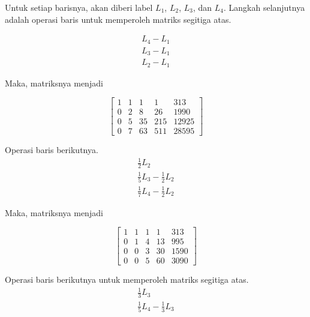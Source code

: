 Untuk setiap barisnya, akan diberi label \begin{math}L_1\end{math}, \begin{math}L_2\end{math}, \begin{math}L_3\end{math}, dan \begin{math}L_4\end{math}. Langkah selanjutnya adalah operasi baris untuk memperoleh matriks segitiga atas.

\begin{align*}
	L_4 - L_1 \\
	L_3 - L_1 \\
	L_2 - L_1
\end{align*}

Maka, matriksnya menjadi

\begin{center}
	\setlength\arraycolsep{15pt}
	\[
	\begin{bmatrix}
			1 	& 1 	& 1 	& 1 		& 313 		\\[1em]
			0 	& 2 	& 8 	& 26 		& 1990		\\[1em]
			0 	& 5 	& 35 	& 215 	& 12925		\\[1em]
			0 	& 7 	& 63 	& 511 	& 28595
	\end{bmatrix}
	\]
\end{center}

Operasi baris berikutnya.
\begin{align*}
	\frac{1}{2}L_2 \\
	\frac{1}{5}L_3 - \frac{1}{2}L_2 \\
	\frac{1}{7}L_4 - \frac{1}{2}L_2
\end{align*}

Maka, matriksnya menjadi

\begin{center}
	\setlength\arraycolsep{15pt}
	\[
	\begin{bmatrix}
			1 	& 1 	& 1 	& 1 		& 313 		\\[1em]
			0 	& 1 	& 4 	& 13 		& 995			\\[1em]
			0 	& 0 	& 3 	& 30 		& 1590		\\[1em]
			0 	& 0 	& 5 	& 60 		& 3090
	\end{bmatrix}
	\]
\end{center}

Operasi baris berikutnya untuk memperoleh matriks segitiga atas.
\begin{align*}
	\frac{1}{3}L_3 \\
	\frac{1}{5}L_4 - \frac{1}{3}L_3
\end{align*}

